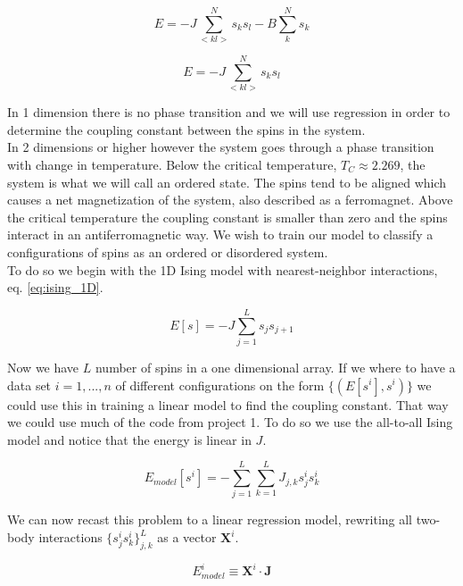 \documentclass[a4paper,12pt, english]{article}
\begin{document}
\begin{equation} \label{eq:Ising}
E = -J \sum_{<kl>}^N s_k s_l - B \sum_k^N s_k
\end{equation}

\begin{equation} \label{eq:Ising_model}
E = -J \sum_{<kl>}^N s_k s_l
\end{equation}

In 1 dimension there is no phase transition and we will use regression in order to determine the coupling constant between the spins in the system.  \\
In 2 dimensions or higher however the system goes through a phase transition with change in temperature. Below the critical temperature, $T_C \approx 2.269$, the system is what we will call an ordered state. The spins tend to be aligned which causes a net magnetization of the system, also described as a ferromagnet. Above the critical temperature the coupling constant is smaller than zero and the spins interact in an antiferromagnetic way. We wish to train our model to classify a configurations of spins as an ordered or disordered system. \\
To do so we begin with the 1D Ising model with nearest-neighbor interactions, eq. \ref{eq:ising_1D}. 

\begin{equation} \label{eq:ising_1D}
E[s] = -J \sum_{j=1}^L s_j s_{j+1}
\end{equation}

Now we have $L$ number of spins in a one dimensional array. If we where to have a data set $i = 1, ..., n$ of different configurations on the form $\{(E[s^i], s^i)\}$ we could use this in training a linear model to find the coupling constant. That way we could use much of the code from project 1. To do so we use the all-to-all Ising model and notice that the energy is linear in $J$.  

\begin{equation} \label{eq:energy}
E_{model}[s^i] = -\sum_{j=1}^L \sum_{k=1}^L J_{j,k} s_j^i s_k^i
\end{equation}

We can now recast this problem to a linear regression model, rewriting all two-body interactions $\{s_j^i s_k^i\}_{j,k}^L$ as a vector $\mathbf{X}^i$. 

\begin{equation} 
E_{model}^i \equiv \mathbf{X}^i \cdot \mathbf{J}
\end{equation}
\end{document}
